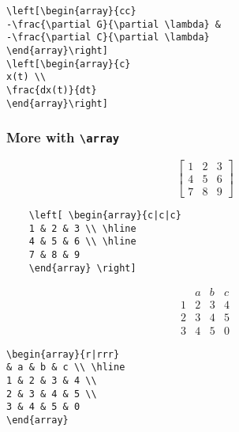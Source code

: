 \documentclass[journal]{IEEEtran}
\begin{document}
\begin{verbatim} 
\left[\begin{array}{cc}
-\frac{\partial G}{\partial \lambda} &
-\frac{\partial C}{\partial \lambda}
\end{array}\right]
\left[\begin{array}{c}	
x(t) \\
\frac{dx(t)}{dt} 
\end{array}\right]
\end{verbatim}

\noindent \dotfill
\subsubsection{More with \texttt{\textbackslash array}}

$$ \left[ \begin{array}{c|c|c}
1 & 2 & 3 \\ \hline
4 & 5 & 6 \\ \hline
7 & 8 & 9
\end{array} \right] $$

\begin{center}
	\begin{verbatim}
	\left[ \begin{array}{c|c|c}
	1 & 2 & 3 \\ \hline
	4 & 5 & 6 \\ \hline
	7 & 8 & 9
	\end{array} \right] 
	\end{verbatim}
\end{center}


$$ \begin{array}{r|rrr}
& a & b & c \\ \hline
1 & 2 & 3 & 4 \\
2 & 3 & 4 & 5 \\
3 & 4 & 5 & 0
\end{array} $$


\begin{verbatim}
\begin{array}{r|rrr}
& a & b & c \\ \hline
1 & 2 & 3 & 4 \\
2 & 3 & 4 & 5 \\
3 & 4 & 5 & 0
\end{array}
\end{verbatim}
\end{document}
